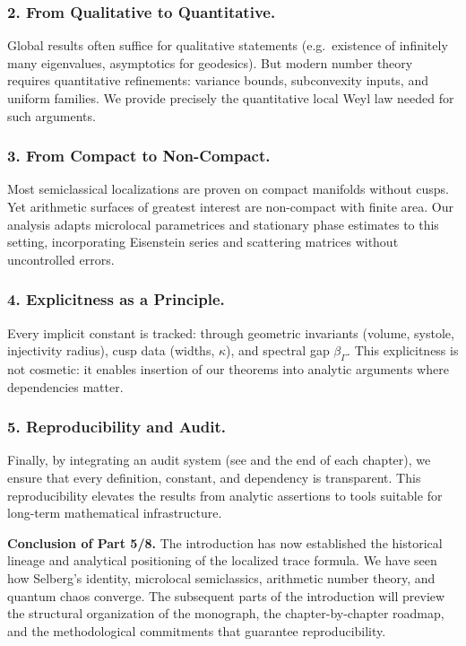 \subsubsection*{2. From Qualitative to Quantitative.}
Global results often suffice for qualitative statements (e.g.\ existence of infinitely many eigenvalues, asymptotics for geodesics). 
But modern number theory requires quantitative refinements: variance bounds, subconvexity inputs, and uniform families. 
We provide precisely the quantitative local Weyl law needed for such arguments.

\subsubsection*{3. From Compact to Non-Compact.}
Most semiclassical localizations are proven on compact manifolds without cusps. 
Yet arithmetic surfaces of greatest interest are non-compact with finite area. 
Our analysis adapts microlocal parametrices and stationary phase estimates to this setting, 
incorporating Eisenstein series and scattering matrices without uncontrolled errors.

\subsubsection*{4. Explicitness as a Principle.}
Every implicit constant is tracked: through geometric invariants (volume, systole, injectivity radius), 
cusp data (widths, $\kappa$), and spectral gap $\beta_\Gamma$. 
This explicitness is not cosmetic: it enables insertion of our theorems into analytic arguments where dependencies matter.

\subsubsection*{5. Reproducibility and Audit.}
Finally, by integrating an audit system (see  and the end of each chapter), 
we ensure that every definition, constant, and dependency is transparent. 
This reproducibility elevates the results from analytic assertions to tools suitable for long-term mathematical infrastructure.

\medskip

\noindent\textbf{Conclusion of Part 5/8.}
The introduction has now established the historical lineage and analytical positioning of the localized trace formula. 
We have seen how Selberg’s identity, microlocal semiclassics, arithmetic number theory, and quantum chaos converge. 
The subsequent parts of the introduction will preview the structural organization of the monograph, 
the chapter-by-chapter roadmap, and the methodological commitments that guarantee reproducibility.

